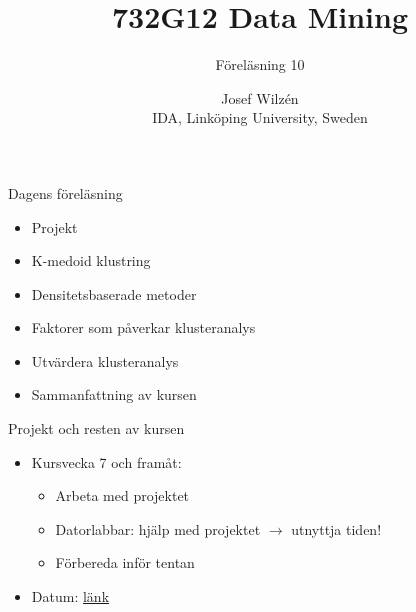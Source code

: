 \documentclass[10pt,english]{beamer}
\title{732G12 Data Mining}
\subtitle{Föreläsning 10}
\date{}
\author{Josef Wilzén \\ IDA, Linköping University, Sweden}
\begin{document}
\maketitle

\begin{frame}{Dagens föreläsning}

    \begin{itemize}
        \item Projekt
        \item K-medoid klustring
        \item Densitetsbaserade metoder
        \item Faktorer som påverkar klusteranalys
        \item Utvärdera klusteranalys
        \item Sammanfattning av kursen
    \end{itemize}
    
\end{frame}

\begin{frame}{Projekt och resten av kursen}
    
  \begin{itemize}
        \item Kursvecka 7 och framåt: 
        \begin{itemize}
          \item Arbeta med projektet
          \item Datorlabbar: hjälp med projektet $\rightarrow$ utnyttja tiden!
          \item Förbereda inför tentan
        \end{itemize}
        \item Datum: \href{https://raw.githubusercontent.com/STIMALiU/732G12_DM/refs/heads/master/project/Datum_ht2024.pdf}{länk}
    \end{itemize}

\end{frame}
\end{document}
